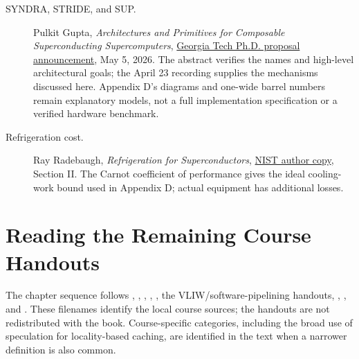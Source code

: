 \begin{description}
  \item[SYNDRA, STRIDE, and SUP.] Pulkit Gupta, \emph{Architectures and Primitives for Composable Superconducting Supercomputers}, \href{https://grad.gatech.edu/events/phd-proposal-pulkit-gupta}{Georgia Tech Ph.D. proposal announcement}, May 5, 2026. The abstract verifies the names and high-level architectural goals; the April 23 recording supplies the mechanisms discussed here. Appendix D's diagrams and one-wide barrel numbers remain explanatory models, not a full implementation specification or a verified hardware benchmark.
  \item[Refrigeration cost.] Ray Radebaugh, \emph{Refrigeration for Superconductors}, \href{https://tsapps.nist.gov/publication/get_pdf.cfm?pub_id=50016}{NIST author copy}, Section II. The Carnot coefficient of performance gives the ideal cooling-work bound used in Appendix D; actual equipment has additional losses.
\end{description}

\section*{Reading the Remaining Course Handouts}
The chapter sequence follows , , , , , the VLIW/software-pipelining handouts, , , and .
These filenames identify the local course sources; the handouts are not redistributed with the book.
Course-specific categories, including the broad use of speculation for locality-based caching, are identified in the text when a narrower definition is also common.

